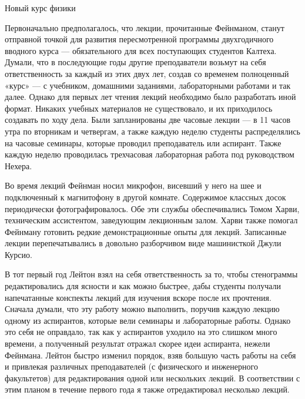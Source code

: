 \documentclass[11pt,oneside]{article}
\begin{document}
Новый курс физики\par



Первоначально предполагалось, что лекции, прочитанные Фейнманом, станут отправной точкой для развития пересмотренной программы двухгодичного вводного курса --- обязательного для всех поступающих студентов Калтеха. Думали, что в последующие годы другие преподаватели возьмут на себя ответственность за каждый из этих двух лет, создав со временем полноценный «курс» --- с учебником, домашними заданиями, лабораторными работами и так далее. Однако для первых лет чтения лекций необходимо было разработать иной формат. Никаких учебных материалов не существовало, и их приходилось создавать по ходу дела. Были запланированы две часовые лекции --- в 11 часов утра по вторникам и четвергам, а также каждую неделю студенты распределялись на часовые семинары, которые проводил преподаватель или аспирант. Также каждую неделю проводилась трехчасовая лабораторная работа под руководством Нехера.\par



Во время лекций Фейнман носил микрофон, висевший у него на шее и подключенный к магнитофону в другой комнате. Содержимое классных досок периодически фотографировалось. Обе эти службы обеспечивались Томом Харви, техническим ассистентом, заведующим лекционным залом. Харви также помогал Фейнману готовить редкие демонстрационные опыты для лекций. Записанные лекции перепечатывались в довольно разборчивом виде машинисткой Джули Курсио.\par



В тот первый год Лейтон взял на себя ответственность за то, чтобы стенограммы редактировались для ясности и как можно быстрее, дабы студенты получали напечатанные конспекты лекций для изучения вскоре после их прочтения. Сначала думали, что эту работу можно выполнить, поручив каждую лекцию одному из аспирантов, которые вели семинары и лабораторные работы. Однако это себя не оправдало, так как у аспирантов уходило на это слишком много времени, а полученный результат отражал скорее идеи аспиранта, нежели Фейнмана. Лейтон быстро изменил порядок, взяв большую часть работы на себя и привлекая различных преподавателей (с физического и инженерного факультетов) для редактирования одной или нескольких лекций. В соответствии с этим планом в течение первого года я также отредактировал несколько лекций.\par
\end{document}
